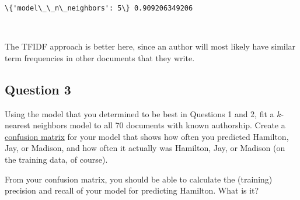 \documentclass[11pt]{article}
\begin{document}
    \begin{Verbatim}[commandchars=\\\{\}]
\{'model\_\_n\_neighbors': 5\} 0.909206349206

    \end{Verbatim}

    \begin{center}
    \end{center}
    { \hspace*{\fill} \\}
    
    The TFIDF approach is better here, since an author will most likely have
similar term frequencies in other documents that they write.

    \hypertarget{question-3}{%
\subsection{Question 3}\label{question-3}}

Using the model that you determined to be best in Questions 1 and 2, fit
a \(k\)-nearest neighbors model to all 70 documents with known
authorship. Create a
\href{https://en.wikipedia.org/wiki/Confusion_matrix}{confusion matrix}
for your model that shows how often you predicted Hamilton, Jay, or
Madison, and how often it actually was Hamilton, Jay, or Madison (on the
training data, of course).

From your confusion matrix, you should be able to calculate the
(training) precision and recall of your model for predicting Hamilton.
What is it?
\end{document}
